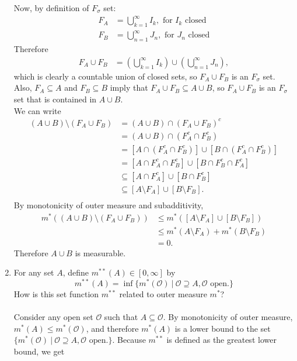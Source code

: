 \begin{enumerate}
	Now, by definition of $F_\sigma$ set:
	\begin{align*}
		F_A &= \bigcup_{k=1}^\infty I_k,\text{ for }I_k\text{ closed}\\
		F_B &= \bigcup_{n=1}^\infty J_n,\text{ for }J_n\text{ closed}
	\end{align*}
	Therefore 
	\begin{align*}
		F_A\cup F_B&=(\bigcup_{k=1}^\infty I_k)\cup(\bigcup_{n=1}^\infty J_n),
	\end{align*}
	which is clearly a countable union of closed sets, so $F_A\cup F_B$ is an $F_\sigma$ set.
	Also, $F_A\subseteq A$ and $F_B\subseteq B$ imply that $F_A\cup F_B\subseteq A\cup B$, so $F_A\cup F_B$ is an $F_\sigma$ set that is contained in $A\cup B$.\\
	We can write
	\begin{align*}
		(A\cup B)\setminus(F_A\cup F_B)&=(A\cup B)\cap(F_A\cup F_B)^c\\
		&=(A\cup B)\cap(F_A^c\cap F_B^c)\\
		&=[A\cap(F_A^c\cap F_B^c)]\cup[B\cap(F_A^c\cap F_B^c)]\\
		&=[A\cap F_A^c\cap F_B^c]\cup[B\cap F_B^c\cap F_A^c]\\
		&\subseteq[A\cap F_A^c]\cup[B\cap F_B^c]\\
		&\subseteq[A\setminus F_A]\cup[B\setminus F_B].\\
	\end{align*}
	By monotonicity of outer measure and subadditivity, 
	\begin{align*}
		m^*((A\cup B)\setminus(F_A\cup F_B))&\le m^*([A\setminus F_A]\cup[B\setminus F_B])\\
		&\le m^*(A\setminus F_A)+m^*(B\setminus F_B)\\
		&=0.
	\end{align*}
	Therefore $A\cup B$ is measurable.\\
	\item For any set $A$, define $m^{**}(A)\in[0,\infty]$ by 
	\[
		m^{**}(A)=\inf\{m^*(\mathcal{O})\ |\ \mathcal{O}\supseteq A, \mathcal{O}\text{ open.}\}	
	\]
	How is this set function $m^{**}$ related to outer measure $m^*$?\\
	\\Consider any open set $\mathcal{O}$ such that $A\subseteq\mathcal{O}$.
	By monotonicity of outer measure, $m^*(A)\le m^*(\mathcal{O})$, and therefore $m^*(A)$ is a lower bound to the set $\{m^*(\mathcal{O})\ |\ \mathcal{O}\supseteq A, \mathcal{O}\text{ open.}\}$.
	Because $m^{**}$ is defined as the greatest lower bound, we get

\end{enumerate}
